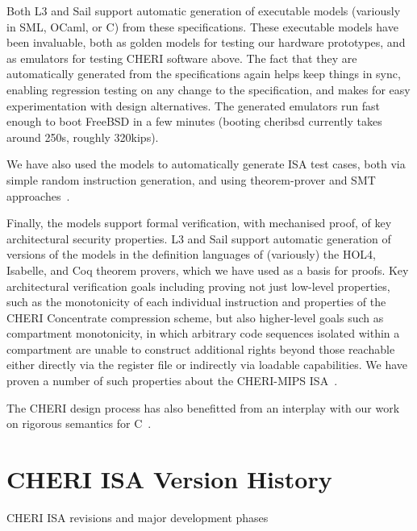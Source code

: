 Both L3 and Sail support automatic generation of executable models
(variously in SML, OCaml, or C) from these specifications.  These
executable models have been invaluable, both as golden models for
testing our hardware prototypes, and as emulators for testing CHERI
software above.  The fact that they are automatically generated from
the specifications again helps keep things in sync, enabling
regression testing on any change to the specification, and makes for
easy experimentation with design alternatives.
The generated emulators run fast enough to boot FreeBSD in a few minutes (booting
cheribsd
currently takes around 250s, roughly 320kips).

We have also used the models to automatically generate ISA test cases,
both via simple random instruction generation, and using
theorem-prover and SMT approaches~\cite{DBLP:journals/scp/CampbellS16}.


Finally, the models support formal verification, with mechanised
proof, of key architectural security properties.
L3 and Sail support automatic generation of versions of the models in
the definition languages of (variously) the
HOL4, Isabelle, and Coq theorem provers, which we have used as a basis
for proofs.
Key architectural verification goals including proving not just low-level
properties, such as the monotonicity of each individual instruction
and properties of the CHERI Concentrate compression scheme, but also
higher-level goals such as compartment monotonicity, in which arbitrary code
sequences isolated within a compartment are unable to construct additional
rights beyond those reachable either directly via the register file or
indirectly via loadable capabilities.
We have proven a number of such properties about the CHERI-MIPS ISA~\cite{cheri-formal-SP2020,UCAM-CL-TR-940}.

The CHERI design process has also benefitted from an interplay with
our work on rigorous semantics for C~\cite{Cerberus-PLDI16,cerberus-popl2019}.


\section{CHERI ISA Version History}


\begin{table}[th!]
\begin{center}
\caption{CHERI ISA revisions and major development phases}

\end{center}
\label{table:intro-cheri-isa-versions}
\end{table}


